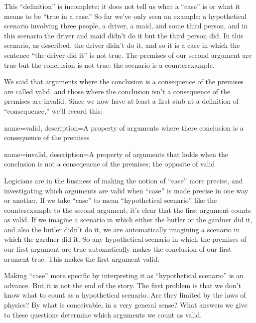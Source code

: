 This ``definition'' is incomplete: it does not tell us what a ``case'' is or what it means to be ``true in a case.''  So far we've only seen an example: a hypothetical scenario involving three people, a driver, a maid, and some third person, and in this scenario the driver and maid didn't do it but the third person did. In this scenario, as described, the driver didn't do it, and so it is a case in which the sentence ``the driver did it'' is not true. The premises of our second argument are true but the conclusion is not true: the scenario is a counterexample.

We said that arguments where the conclusion is a consequence of the premises are called valid, and those where the conclusion isn't a consequence of the premises are invalid. Since we now have at least a first stab at a definition of ``consequence,'' we'll record this: 



{
name=valid,
description={A property of arguments where there conclusion is a consequence of the premises}
}

{
name=invalid,
description={A property of arguments that holds when the conclusion is not a conseqeucne of the premises; the opposite of \gls{valid}}
}

Logicians are in the business of making the notion of ``case'' more precise, and investigating which arguments are valid when ``case'' is made precise in one way or another. If we take ``case'' to mean ``hypothetical scenario'' like the counterexample to the second argument, it's clear that the first argument counts as valid. If we imagine a scenario in which either the butler or the gardner did it, and also the butler didn't do it, we are automatically imagining a scenario in which the gardner did it. So any hypothetical scenario in which the premises of our first argument are true automatically makes the conclusion of our first arument true. This makes the first argument valid. 

Making ``case'' more specific by interpreting it as ``hypothetical scenario'' is an advance. But it is not the end of the story.  The first problem is that we don't know what to count as a hypothetical scenario. Are they limited by the laws of physics? By what is conceivable, in a very general sense?  What answers we give to these questions determine which arguments we count as valid.

